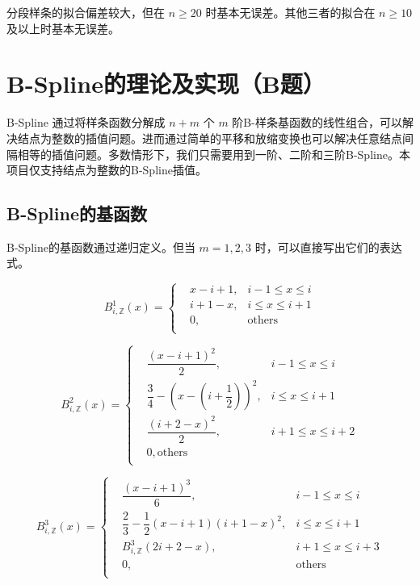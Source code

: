 \documentclass{ctexart}
\begin{document}
分段样条的拟合偏差较大，但在 $n\geq 20$ 时基本无误差。其他三者的拟合在 $n\geq 10$ 及以上时基本无误差。

\section{B-Spline的理论及实现（B题）}

B-Spline 通过将样条函数分解成 $n+m$ 个 $m$ 阶B-样条基函数的线性组合，可以解决结点为整数的插值问题。进而通过简单的平移和放缩变换也可以解决任意结点间隔相等的插值问题。多数情形下，我们只需要用到一阶、二阶和三阶B-Spline。本项目仅支持结点为整数的B-Spline插值。

\subsection{B-Spline的基函数}

B-Spline的基函数通过递归定义。但当 $m=1,2,3$ 时，可以直接写出它们的表达式。

\begin{equation}
B_{i,\mathbb{Z}}^1(x)=\left\{
\begin{aligned}
    & x-i+1, & i-1\leq x\leq i\\
    & i+1-x, & i\leq x\leq i+1\\
    & 0, & \text{others}\\
\end{aligned}
\right.
\end{equation}

\begin{equation}
B_{i,\mathbb{Z}}^2(x)=\left\{
\begin{aligned}
    & \dfrac{(x-i+1)^2}2, & i-1\leq x\leq i\\
    & \dfrac 34 - (x-(i+\dfrac 12))^2, & i\leq x\leq i+1\\
    & \dfrac{(i+2-x)^2}2, & i+1\leq x\leq i+2\\
    & 0,\text{others}\\
\end{aligned}
\right.
\end{equation}

\begin{equation}
B_{i,\mathbb{Z}}^3(x)=\left\{
\begin{aligned}
    & \dfrac{(x-i+1)^3}6, & i-1\leq x\leq i\\
    & \dfrac 23 - \dfrac 12 (x-i+1)(i+1-x)^2, & i\leq x\leq i+1\\
    & B_{i,\mathbb{Z}}^3(2i+2-x), & i+1\leq x\leq i+3\\
    & 0, & \text{others}\\
\end{aligned}
\right.
\end{equation}
\end{document}
